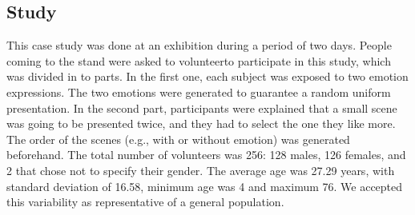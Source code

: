 \subsection{Study}

This case study was done at an exhibition during a period of two days. People coming to the stand were asked to volunteerto participate in this study, which was divided in to parts. In the first one, each subject was exposed to two emotion expressions. %
The two emotions were generated to guarantee a random uniform presentation. In the second part, participants were explained that a small scene was going to be presented twice, and they had to select the one they like more. The order of the scenes (e.g., with or without emotion) was generated beforehand. The total number of volunteers was 256: 128 males, 126 females, and 2 that chose not to specify their gender. The average age was 27.29 years, with standard deviation of 16.58, minimum age was 4 and maximum 76. We accepted this variability as representative of a general population.
